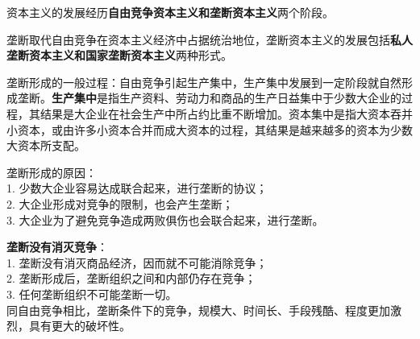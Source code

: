 资本主义的发展经历{\textbf{自由竞争资本主义和垄断资本主义}}两个阶段。

垄断取代自由竞争在资本主义经济中占据统治地位，垄断资本主义的发展包括\textbf{{私人垄断资本主义和国家垄断资本主义}}两种形式。

{垄断形成的一般过程：自由竞争引起生产集中，生产集中发展到一定阶段就自然形成垄断。}{\textbf{{生产集中}}是指生产资料、劳动力和商品的生产日益集中于少数大企业的过程}{，其结果是大企业在社会生产中所占约比重不断增加。资本集中是指大资本吞并小资本，或由许多小资本合并而成大资本的过程，其结果是越来越多的资本为少数大资本所支配。}

垄断形成的原因：\\
1. 少数大企业容易达成联合起来，进行垄断的协议；\\
2. 大企业形成对竞争的限制，也会产生垄断；\\

3. 大企业为了避免竞争造成两败俱伤也会联合起来，进行垄断。

{\textbf{垄断没有消灭竞争}}：\\
1. 垄断没有消灭商品经济，因而就不可能消除竞争；\\
2. 垄断形成后，垄断组织之间和内部仍存在竞争；\\
3. 任何垄断组织不可能垄断一切。\\

{同自由竞争相比，垄断条件下的竞争，规模大、时间长、手段残酷、程度更加激烈，具有更大的破坏性。}
